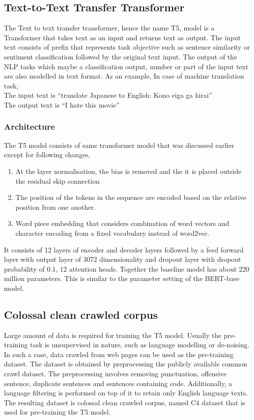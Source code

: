 \subsection{Text-to-Text Transfer Transformer}
The Text to text transfer transformer, hence the name T5, model is a Transformer that takes text as an input and returns text as output. The input text consists of prefix that represents task objective such as sentence similarity or sentiment classification followed by the original text input. The output of the NLP tasks which maybe a classification output, number or part of the input text are also modelled in text format. As an example, In case of machine translation task, \\
The input text is “translate Japanese to English: Kono eiga ga kirai”\\
The output text is “I hate this movie”

\subsubsection{Architecture}
The T5 model consists of same transformer model that was discussed earlier except for following changes,
\begin{enumerate}
\item At the layer normalisation, the bias is removed and the it is placed outside the residual skip connection
\item The position of the tokens in the sequence are encoded based on the relative position from one another. 
\item Word piece embedding that considers combination of word vectors and character encoding from a fixed vocabulary instead of word2vec. 
\end{enumerate}
It consists of 12 layers of encoder and decoder layers followed by a feed forward layer with output layer of 3072 dimensionality and dropout layer with dropout probability of 0.1, 12 attention heads. Together the baseline model has about 220 million parameters. This is similar to the parameter setting of the BERT-base model.
\subsection{Colossal clean crawled corpus}
Large amount of data is required for training the T5 model. Usually the pre-training task is unsupervised in nature, such as language modelling or de-noising. In such a case, data crawled from web pages can be used as the pre-training dataset. 
The dataset is obtained by preprocessing the publicly available common crawl dataset. The preprocessing involves removing punctuation, offensive sentence, duplicate sentences and sentences containing code. Additionally, a language filtering is performed on top of it to retain only English language texts. The resulting dataset is colossal clean crawled corpus, named C4 dataset that is used for pre-training the T5 model. 




